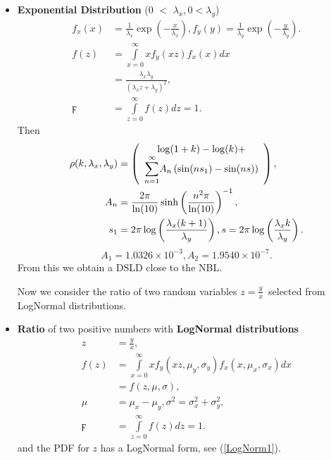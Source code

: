 \documentclass[titlepage,fleqn]{article}%
\begin{document}
\begin{itemize}
\item \textbf{Exponential Distribution} ($0$%
$<$%
$\lambda_{x},0<\lambda_{y}$)%
\begin{align*}
f_{x}(x)  &  =\frac{1}{\lambda_{x}}\exp\left(  -\frac{x}{\lambda_{x}}\right)
,f_{y}(y)=\frac{1}{\lambda_{y}}\exp\left(  -\frac{y}{\lambda_{y}}\right)  .\\
f(z)  &  =%
{\displaystyle\int\limits_{x=0}^{\infty}}
xf_{y}(xz)f_{x}(x)dx\\
&  =\frac{\lambda_{x}\lambda_{y}}{\left(  \lambda_{x}z+\lambda_{y}\right)
^{2}},\\
\digamma &  =%
{\displaystyle\int\limits_{z=0}^{\infty}}
f(z)dz=1.
\end{align*}
Then%
\begin{align*}
\rho(k,\lambda_{x},\lambda_{y})  &  =\left(
\begin{array}
[c]{c}%
\log(1+k)-\log(k)+\\%
{\displaystyle\sum\limits_{n=1}^{\infty}}
A_{n}\left(  \sin(ns_{1}\right)  -\sin(ns))
\end{array}
\right)  ,\\
A_{n}  &  =\frac{2\pi}{\ln(10)}\sinh\left(  \frac{n^{2}\pi}{\ln(10)}\right)
^{-1},\\
s_{1}  &  =2\pi\log\left(  \frac{\lambda_{x}(k+1)}{\lambda_{y}}\right)
,s=2\pi\log\left(  \frac{\lambda_{x}k}{\lambda_{y}}\right)  .
\end{align*}%
\[
A_{1}=1.0326\times10^{-3},A_{2}=1.9540\times10^{-7}.
\]
From this we obtain a DSLD close to the NBL.

Now we consider the ratio of two random variables $z=\frac{y}{x}$\ selected
from LogNormal distributions.

\item \textbf{Ratio } of two positive numbers with \textbf{LogNormal
distributions}%
\begin{align*}
z  &  =\frac{y}{x},\\
f(z)  &  =%
{\displaystyle\int\limits_{x=0}^{\infty}}
xf_{y}(xz,\mu_{y},\sigma_{y})f_{x}(x,\mu_{x},\sigma_{x})dx\\
&  =f(z,\mu,\sigma),\\
\mu &  =\mu_{x}-\mu_{y},\sigma^{2}=\sigma_{x}^{2}+\sigma_{y}^{2},\\
\digamma &  =%
{\displaystyle\int\limits_{z=0}^{\infty}}
f(z)dz=1.
\end{align*}
and the PDF for $z$ has a LogNormal form, see (\ref{LogNorm1}).
\end{itemize}
\end{document}
